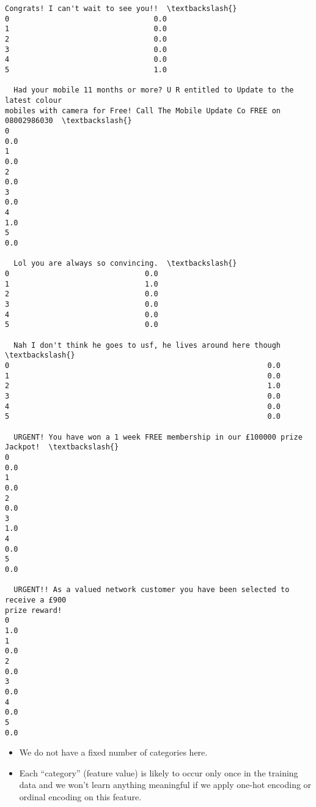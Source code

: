 \documentclass[11pt]{article}
\makeatletter
\providecommand{\tightlist}{%
      \setlength{\itemsep}{0pt}\setlength{\parskip}{0pt}}
\newcommand{\boxspacing}{\kern\kvtcb@left@rule\kern\kvtcb@boxsep}
\newcommand{\prompt}[4]{
        {\ttfamily\llap{{\color{#2}[#3]:\hspace{3pt}#4}}\vspace{-\baselineskip}}
    }
\makeatother
\begin{document}
            \begin{tcolorbox}[breakable, size=fbox, boxrule=.5pt, pad at break*=1mm, opacityfill=0]
\prompt{Out}{outcolor}{91}{\boxspacing}
\begin{Verbatim}[commandchars=\\\{\}]
  Congrats! I can't wait to see you!!  \textbackslash{}
0                                 0.0
1                                 0.0
2                                 0.0
3                                 0.0
4                                 0.0
5                                 1.0

  Had your mobile 11 months or more? U R entitled to Update to the latest colour
mobiles with camera for Free! Call The Mobile Update Co FREE on 08002986030  \textbackslash{}
0
0.0
1
0.0
2
0.0
3
0.0
4
1.0
5
0.0

  Lol you are always so convincing.  \textbackslash{}
0                               0.0
1                               1.0
2                               0.0
3                               0.0
4                               0.0
5                               0.0

  Nah I don't think he goes to usf, he lives around here though  \textbackslash{}
0                                                           0.0
1                                                           0.0
2                                                           1.0
3                                                           0.0
4                                                           0.0
5                                                           0.0

  URGENT! You have won a 1 week FREE membership in our £100000 prize Jackpot!  \textbackslash{}
0                                                                         0.0
1                                                                         0.0
2                                                                         0.0
3                                                                         1.0
4                                                                         0.0
5                                                                         0.0

  URGENT!! As a valued network customer you have been selected to receive a £900
prize reward!
0
1.0
1
0.0
2
0.0
3
0.0
4
0.0
5
0.0
\end{Verbatim}
\end{tcolorbox}
        
    \begin{itemize}
\tightlist
\item
  We do not have a fixed number of categories here.
\item
  Each ``category'' (feature value) is likely to occur only once in the
  training data and we won't learn anything meaningful if we apply
  one-hot encoding or ordinal encoding on this feature.
\end{itemize}
\end{document}
